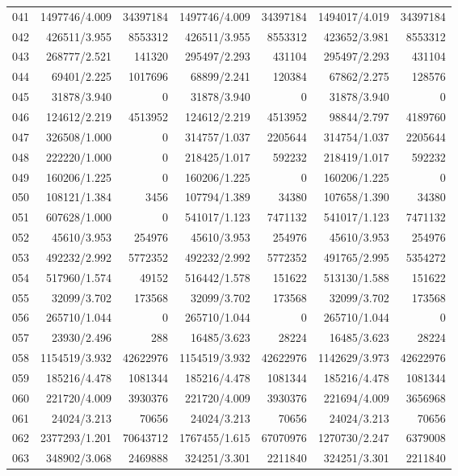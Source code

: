 \begin{longtable}{crrrrrr}
041 & 1497746/4.009 & 34397184 & 1497746/4.009 & 34397184 & 1494017/4.019 & 34397184 \\
042 & 426511/3.955 & 8553312 & 426511/3.955 & 8553312 & 423652/3.981 & 8553312 \\
043 & 268777/2.521 & 141320 & 295497/2.293 & 431104 & 295497/2.293 & 431104 \\
044 & 69401/2.225 & 1017696 & 68899/2.241 & 120384 & 67862/2.275 & 128576 \\
045 & 31878/3.940 & 0 & 31878/3.940 & 0 & 31878/3.940 & 0 \\
046 & 124612/2.219 & 4513952 & 124612/2.219 & 4513952 & 98844/2.797 & 4189760 \\
047 & 326508/1.000 & 0 & 314757/1.037 & 2205644 & 314754/1.037 & 2205644 \\
048 & 222220/1.000 & 0 & 218425/1.017 & 592232 & 218419/1.017 & 592232 \\
049 & 160206/1.225 & 0 & 160206/1.225 & 0 & 160206/1.225 & 0 \\
050 & 108121/1.384 & 3456 & 107794/1.389 & 34380 & 107658/1.390 & 34380 \\
051 & 607628/1.000 & 0 & 541017/1.123 & 7471132 & 541017/1.123 & 7471132 \\
052 & 45610/3.953 & 254976 & 45610/3.953 & 254976 & 45610/3.953 & 254976 \\
053 & 492232/2.992 & 5772352 & 492232/2.992 & 5772352 & 491765/2.995 & 5354272 \\
054 & 517960/1.574 & 49152 & 516442/1.578 & 151622 & 513130/1.588 & 151622 \\
055 & 32099/3.702 & 173568 & 32099/3.702 & 173568 & 32099/3.702 & 173568 \\
056 & 265710/1.044 & 0 & 265710/1.044 & 0 & 265710/1.044 & 0 \\
057 & 23930/2.496 & 288 & 16485/3.623 & 28224 & 16485/3.623 & 28224 \\
058 & 1154519/3.932 & 42622976 & 1154519/3.932 & 42622976 & 1142629/3.973 & 42622976 \\
059 & 185216/4.478 & 1081344 & 185216/4.478 & 1081344 & 185216/4.478 & 1081344 \\
060 & 221720/4.009 & 3930376 & 221720/4.009 & 3930376 & 221694/4.009 & 3656968 \\
061 & 24024/3.213 & 70656 & 24024/3.213 & 70656 & 24024/3.213 & 70656 \\
062 & 2377293/1.201 & 70643712 & 1767455/1.615 & 67070976 & 1270730/2.247 & 6379008 \\
063 & 348902/3.068 & 2469888 & 324251/3.301 & 2211840 & 324251/3.301 & 2211840 \\

\end{longtable}
